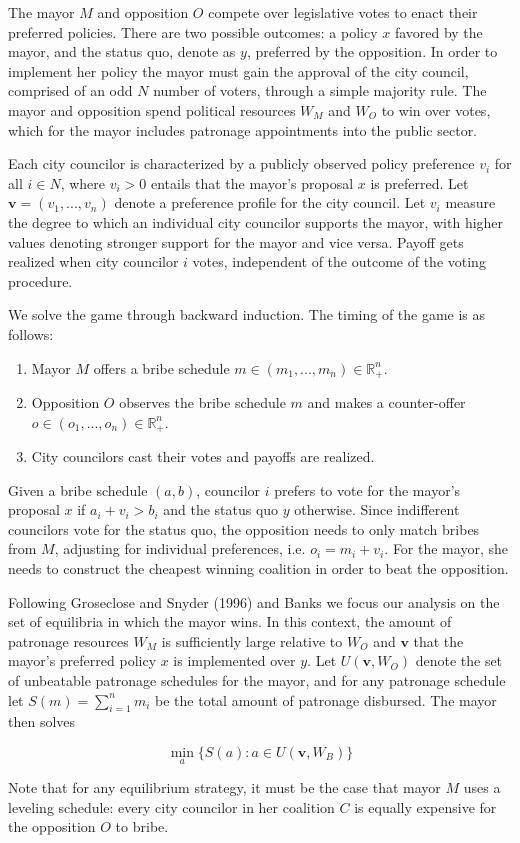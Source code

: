 \documentclass[12pt,a4paper]{article}
\newcommand{\real}{\mathbb{R}_+^n}
\newcommand{\bfv}{\mathbf{v}}
\begin{document}
The mayor $M$ and opposition $O$ compete over legislative votes to enact their preferred policies. There are two possible outcomes: a policy $x$ favored by the mayor, and the status quo, denote as $y$, preferred by the opposition. In order to implement her policy the mayor must gain the approval of the city council, comprised of an odd $N$ number of voters, through a simple majority rule. The mayor and opposition spend political resources $W_M$ and $W_O$ to win over votes, which for the mayor includes patronage appointments into the public sector.

Each city councilor is characterized by a publicly observed policy preference $v_i$ for all $i \in N$, where $v_i > 0$ entails that the mayor's proposal $x$ is preferred. Let $\mathbf{v} = (v_1, ..., v_n)$ denote a preference profile for the city council. Let $v_i$ measure the degree to which an individual city councilor supports the mayor, with higher values denoting stronger support for the mayor and vice versa. Payoff gets realized when city councilor $i$ votes, independent of the outcome of the voting procedure.

We solve the game through backward induction. The timing of the game is as follows:

\begin{enumerate}
    \item Mayor $M$ offers a bribe schedule $m \in (m_1, ..., m_n) \in \real$.
    \item Opposition $O$ observes the bribe schedule $m$ and makes a counter-offer $o \in (o_1, ..., o_n) \in \real$.
    \item City councilors cast their votes and payoffs are realized.
\end{enumerate}

Given a bribe schedule $(a, b)$, councilor $i$ prefers to vote for the mayor's proposal $x$ if $a_i + v_i > b_i$ and the status quo $y$ otherwise. Since indifferent councilors vote for the status quo, the opposition needs to only match bribes from $M$, adjusting for individual preferences, i.e. $o_i = m_i + v_i$. For the mayor, she needs to construct the cheapest winning coalition in order to beat the opposition. 

Following Groseclose and Snyder (1996) and Banks we focus our analysis on the set of equilibria in which the mayor wins. In this context, the amount of patronage resources $W_M$ is sufficiently large relative to $W_O$ and $\bfv$ that the mayor's preferred policy $x$ is implemented over $y$. Let $U(\bfv, W_O)$ denote the set of unbeatable patronage schedules for the mayor, and for any patronage schedule let $S(m) = \sum_{i = 1}^n m_i$ be the total amount of patronage disbursed. The mayor then solves

\begin{equation}
    \label{eqn:solution}
    \min_a\{S(a) : a \in U(\mathbf{v}, W_B) \}
\end{equation}

Note that for any equilibrium strategy, it must be the case that mayor $M$ uses a leveling schedule: every city councilor in her coalition $C$ is equally expensive for the opposition $O$ to bribe.


\end{document}

